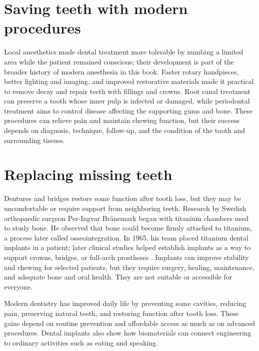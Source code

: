 \documentclass[12pt,oneside]{book}
\begin{document}
\section{Saving teeth with modern procedures}
Local anesthetics made dental treatment more tolerable by numbing a limited
area while the patient remained conscious; their development is part of the
broader history of modern anesthesia in this book. Faster rotary handpieces,
better lighting and imaging, and improved restorative materials made it
practical to remove decay and repair teeth with fillings and crowns. Root
canal treatment can preserve a tooth whose inner pulp is infected or damaged,
while periodontal treatment aims to control disease affecting the supporting
gums and bone. These procedures can relieve pain and maintain chewing
function, but their success depends on diagnosis, technique, follow-up, and
the condition of the tooth and surrounding tissues.

\section{Replacing missing teeth}
Dentures and bridges restore some function after tooth loss, but they may be
uncomfortable or require support from neighboring teeth. Research by Swedish
orthopaedic surgeon Per-Ingvar Br\aa nemark began with titanium chambers used
to study bone. He observed that bone could become firmly attached to titanium,
a process later called osseointegration. In 1965, his team placed titanium
dental implants in a patient; later clinical studies helped establish implants
as a way to support crowns, bridges, or full-arch prostheses \cite{branemarkImplantReview,titaniumDentistryReview}.
Implants can improve stability and chewing for selected patients, but they
require surgery, healing, maintenance, and adequate bone and oral health.
They are not suitable or accessible for everyone.

Modern dentistry has improved daily life by preventing some cavities,
reducing pain, preserving natural teeth, and restoring function after tooth
loss. These gains depend on routine prevention and affordable access as much
as on advanced procedures. Dental implants also show how biomaterials can
connect engineering to ordinary activities such as eating and speaking.
\end{document}
